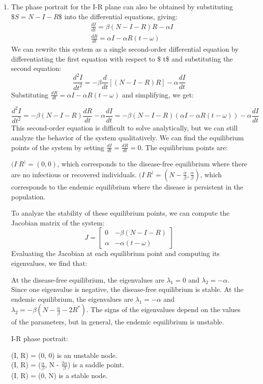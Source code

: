\documentclass{article}
\begin{document}
\begin{enumerate}
\item The phase portrait for the I-R plane can also be obtained by substituting $\$ S=N-I-R \$$ into the differential equations, giving:
$$
\begin{aligned}
& \frac{d I}{d t}=\beta(N-I-R) R-\alpha I \\
& \frac{d R}{d t}=\alpha I-\alpha R(t-\omega)
\end{aligned}
$$
We can rewrite this system as a single second-order differential equation by differentiating the first equation with respect to $\$$ t\$ and substituting the second equation:
$$
\frac{d^2 I}{d t^2}=-\beta \frac{d}{d t}[(N-I-R) R]-\alpha \frac{d I}{d t}
$$
Substituting $\frac{dR}{dt} = \alpha I - \alpha R(t-\omega)$ and simplifying, we get:


$$
\frac{d^2 I}{d t^2}=-\beta(N-I-R) \frac{d R}{d t}-\alpha \frac{d I}{d t}=-\beta(N-I-R)(\alpha I-\alpha R(t-\omega))-\alpha \frac{d I}{d t}
$$
This second-order equation is difficult to solve analytically, but we can still analyze the behavior of the system qualitatively. We can find the equilibrium points of the system by setting $\frac{dI}{dt} = \frac{dR}{dt} = 0$. The equilibrium points are:

$(I^, R^) = (0, 0)$, which corresponds to the disease-free equilibrium where there are no infectious or recovered individuals.
$(I^, R^) = (N-\frac{\alpha}{\beta}, \frac{\alpha}{\beta})$, which corresponds to the endemic equilibrium where the disease is persistent in the population.

To analyze the stability of these equilibrium points, we can compute the Jacobian matrix of the system:
$$
J=\left[\begin{array}{cc}
0 & -\beta(N-I-R) \\
\alpha & -\alpha(t-\omega)
\end{array}\right]
$$
Evaluating the Jacobian at each equilibrium point and computing its eigenvalues, we find that:

At the disease-free equilibrium, the eigenvalues are $\lambda_1 = 0$ and $\lambda_2 = -\alpha$. Since one eigenvalue is negative, the disease-free equilibrium is stable.
At the endemic equilibrium, the eigenvalues are $\lambda_1 = -\alpha$ and $\lambda_2 = -\beta(N-\frac{\alpha}{\beta}-2R^*)$. The signs of the eigenvalues depend on the values of the parameters, but in general, the endemic equilibrium is unstable.

I-R phase portrait:

(I, R) = (0, 0) is an unstable node.\\
(I, R) = ($\frac{\alpha}{\beta}$, N - $\frac{2\alpha}{\beta}$) is a saddle point.\\
(I, R) = (0, N) is a stable node.\\



\end{enumerate}
\end{document}
